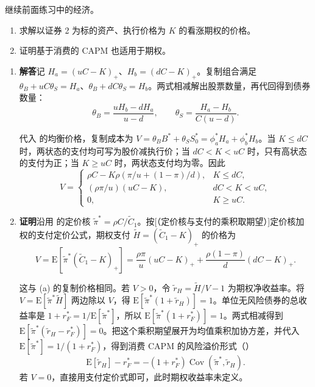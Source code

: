 \par\noindent\begin{minipage}{\linewidth}
\begin{problem}
 继续前面练习中的经济。
\begin{enumerate}[label=(\alph*)]
    \item 求解以证券 2 为标的资产、执行价格为 $K$ 的看涨期权的价格。
    \item 证明基于消费的 CAPM 也适用于期权。
\end{enumerate}
\end{problem}
\end{minipage}\par
{}
\begin{solution}[blank-type=manual,blank-vsep=8\baselineskip]
\begin{enumerate}[label=(\alph*)]
 \item \textbf{解答}\quad 记 $H_a=(uC-K)_+$、$H_b=(dC-K)_+$。复制组合满足 $\theta_B+uC\theta_S=H_a$、$\theta_B+dC\theta_S=H_b$。两式相减解出股票数量，再代回得到债券数量：
 \[
 \theta_B=\frac{uH_b-dH_a}{u-d},\qquad
 \theta_S=\frac{H_a-H_b}{C(u-d)}.
 \]

 代入 的均衡价格，复制成本为 $V=\theta_BB^*+\theta_SS_0^*=\phi_a^*H_a+\phi_b^*H_b$。当 $K\le dC$ 时，两状态的支付均可写为股价减执行价；当 $dC<K<uC$ 时，只有高状态的支付为正；当 $K\ge uC$ 时，两状态支付均为零。因此
 \[
 V=\begin{cases}
 \rho C-K\rho(\pi/u+(1-\pi)/d),&K\le dC,\\
 (\rho\pi/u)(uC-K),&dC<K<uC,\\
 0,&K\ge uC.
 \end{cases}
 \]

 \item \textbf{证明}\quad 沿用 的定价核 $\widetilde\pi^*=\rho C/\widetilde C_1$。按\ifdefined\WJHandoutKnowledge {}[（定价核与支付的乘积取期望）]\else 定价核加权的支付定价公式\fi，期权支付 $\tilde H=(\widetilde C_1-K)_+$ 的价格为
 \[
 V=\mathrm E[\widetilde\pi^*(\widetilde C_1-K)_+]
 =\frac{\rho\pi}{u}(uC-K)_+
  +\frac{\rho(1-\pi)}d(dC-K)_+.
 \]

 这与 (a) 的复制价格相同。若 $V>0$，令 $\tilde r_H=\tilde H/V-1$ 为期权净收益率。将 $V=\mathrm E[\widetilde\pi^*\tilde H]$ 两边除以 $V$，得 $\mathrm E[\widetilde\pi^*(1+\tilde r_H)]=1$。单位无风险债券的总收益率是 $1+r_F^*=1/\mathrm E[\widetilde\pi^*]$，所以 $\mathrm E[\widetilde\pi^*(1+r_F^*)]=1$。两式相减得到 $\mathrm E[\widetilde\pi^*(\tilde r_H-r_F^*)]=0$。把这个乘积期望展开为均值乘积加协方差，并代入 $\mathrm E[\widetilde\pi^*]=1/(1+r_F^*)$，得到消费 CAPM 的风险溢价形式\ifdefined\WJHandoutKnowledge（）\fi
 \[
 \mathrm E[\tilde r_H]-r_F^*
 =-(1+r_F^*)\operatorname{Cov}(\widetilde\pi^*,\tilde r_H).
 \]
 若 $V=0$，直接用支付定价式即可，此时期权收益率未定义。
\end{enumerate}
\end{solution}

